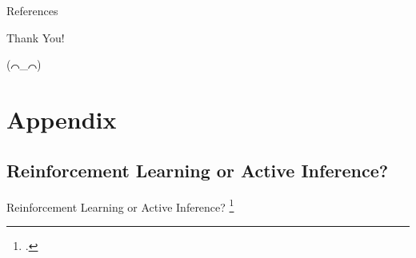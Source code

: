 \documentclass[t,aspectratio=169,xcolor=dvipsnames]{beamer}
\newcommand\blfootcitetext[1]{%
  \begingroup
  \renewcommand\thefootnote{}\footcitetext{#1}%
  \addtocounter{footnote}{-1}%
  \endgroup
}
\newcommand{\citec}[1]{\hfill\textcolor{lightgray}{\citep{#1}}}
\newcommand{\cname}[2]{\texorpdfstring{#1 \citec{#2}}{#1}}
\begin{document}

\section[]{}
\begin{frame}[allowframebreaks]{References}
    \printbibliography
\end{frame}

\begin{frame}[c]
    \Huge{\centerline{Thank You!}}\vspace{12pt}
    \centering \Large \begin{CJK}{UTF8}{min} (⌒\_⌒) \end{CJK}
\end{frame}

\setcounter{framenumberappendix}{\value{framenumber}}
\appendix
\addtocounter{framenumber}{\value{framenumberappendix}}
\addtocounter{framenumberappendix}{-\value{framenumber}}


\section*{Appendix}
\subsection*{\cname{Reinforcement Learning or Active Inference?}{friston2009reinforcement}}
\begin{frame}[label=RLvsAIf]{Reinforcement Learning or Active Inference?}
    \blfootcitetext{friston2009reinforcement}
    
\end{frame}
\end{document}
